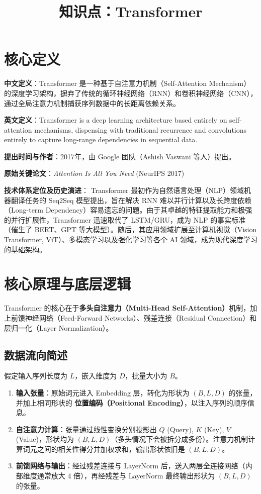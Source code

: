 \documentclass[12pt, a4paper]{article}
\title{知识点：Transformer}
\author{}
\date{}
\begin{document}
\maketitle

\section{核心定义}
\textbf{中文定义}：Transformer 是一种基于自注意力机制（Self-Attention Mechanism）的深度学习架构，摒弃了传统的循环神经网络（RNN）和卷积神经网络（CNN），通过全局注意力机制捕获序列数据中的长距离依赖关系。

\textbf{英文定义}：Transformer is a deep learning architecture based entirely on self-attention mechanisms, dispensing with traditional recurrence and convolutions entirely to capture long-range dependencies in sequential data.

\textbf{提出时间与作者}：2017年，由 Google 团队（Ashish Vaswani 等人）提出。

\textbf{原始关键论文}：\textit{Attention Is All You Need} (NeurIPS 2017)

\textbf{技术体系定位及历史演进}：
Transformer 最初作为自然语言处理（NLP）领域机器翻译任务的 Seq2Seq 模型提出，旨在解决 RNN 难以并行计算以及长跨度依赖（Long-term Dependency）容易遗忘的问题。由于其卓越的特征提取能力和极强的并行扩展性，Transformer 迅速取代了 LSTM/GRU，成为 NLP 的事实标准（催生了 BERT、GPT 等大模型）。随后，其应用领域扩展至计算机视觉（Vision Transformer, ViT）、多模态学习以及强化学习等各个 AI 领域，成为现代深度学习的基础架构。

\section{核心原理与底层逻辑}
Transformer 的核心在于\textbf{多头自注意力（Multi-Head Self-Attention）}机制，加上前馈神经网络（Feed-Forward Networks）、残差连接（Residual Connection）和层归一化（Layer Normalization）。

\subsection{数据流向简述}
假定输入序列长度为 $L$，嵌入维度为 $D$，批量大小为 $B$。
\begin{enumerate}
    \item \textbf{输入张量}：原始词元进入 Embedding 层，转化为形状为 $(B, L, D)$ 的张量，并加上相同形状的 \textbf{位置编码（Positional Encoding）}，以注入序列的顺序信息。
    \item \textbf{自注意力计算}：张量通过线性变换分别投影出 $Q$ (Query), $K$ (Key), $V$ (Value)，形状均为 $(B, L, D)$（多头情况下会被拆分成多份）。注意力机制计算词元之间的相关性得分并加权求和，输出形状依旧是 $(B, L, D)$。
    \item \textbf{前馈网络与输出}：经过残差连接与 LayerNorm 后，送入两层全连接网络（内部维度通常放大 4 倍），再经残差与 LayerNorm 最终输出形状为 $(B, L, D)$ 的张量。
\end{enumerate}
\end{document}
